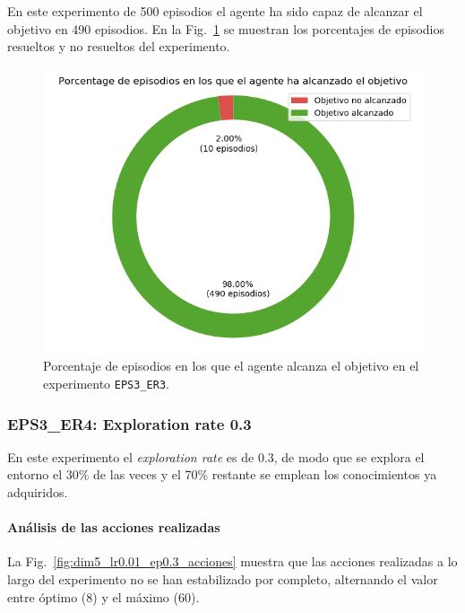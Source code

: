 En este experimento de 500 episodios el agente ha sido capaz de alcanzar el objetivo en 490 episodios. En la Fig.~\ref{fig:dim5_lr0.01_ep0.2_porcentajeResuelto} se muestran los porcentajes de episodios resueltos y no resueltos del experimento. 

\begin{figure}
    \centering
    \includegraphics[scale=0.4]{cap5_experimentacion/images/dim5_lr0.01_ep0.2_porcentajeResuelto.png}
    \caption{Porcentaje de episodios en los que el agente alcanza el objetivo en el experimento \texttt{EPS3\_ER3}.}
    \label{fig:dim5_lr0.01_ep0.2_porcentajeResuelto}
\end{figure}

\subsubsection{EPS3\_ER4: Exploration rate 0.3} \label{EPS2_ER4}

En este experimento el \textit{exploration rate} es de 0.3, de modo que se explora el entorno el 30\% de las veces y el 70\% restante se emplean los conocimientos ya adquiridos.

\paragraph{Análisis de las acciones realizadas}

La Fig.~\ref{fig:dim5_lr0.01_ep0.3_acciones} muestra que las acciones realizadas a lo largo del experimento no se han estabilizado por completo, alternando el valor entre óptimo (8) y el máximo (60). \\

